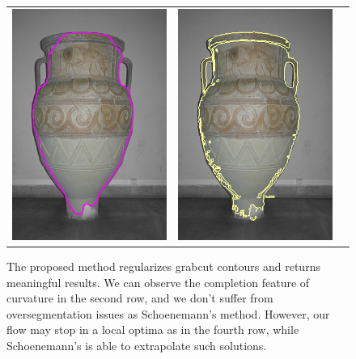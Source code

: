 \documentclass[runningheads]{llncs}
\begin{document}
\begin{figure}
\begin{tabular}{ccc}
		\includegraphics[scale=0.2]{images/segmentation/vase/corrected-seg.png} &					\includegraphics[scale=0.2]{images/segmentation/schoenemann/vase/vase-seg.png}		
	\end{tabular}
	\caption{The proposed method regularizes grabcut contours and returns meaningful results. We can observe the completion feature of curvature in the second row, and we don't suffer from oversegmentation issues as Schoenemann's method. However, our flow may stop in a local optima as in the fourth row, while Schoenemann's is able to extrapolate such solutions.}
	\label{fig:segmentation-results}	
\end{figure}
\end{document}
